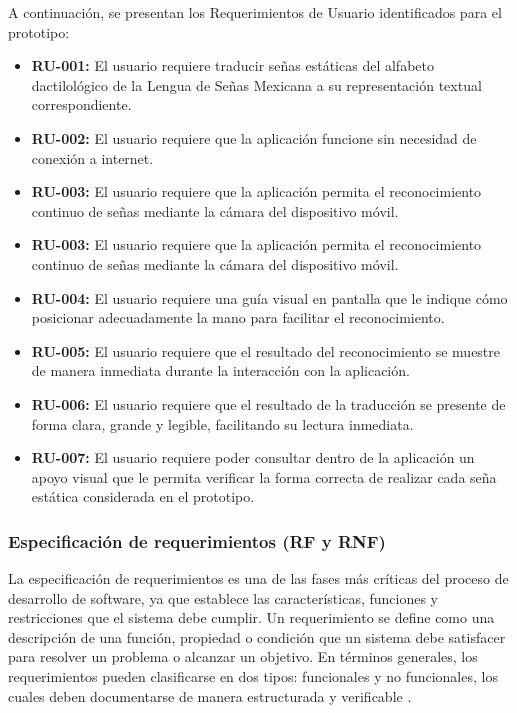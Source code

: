 	A continuación, se presentan los Requerimientos de Usuario identificados para el prototipo:
	
	\begin{itemize}
		\item \textbf{RU-001:} El usuario requiere traducir señas estáticas del alfabeto dactilológico de la Lengua de Señas Mexicana a su representación textual correspondiente.
		
		\item \textbf{RU-002:} El usuario requiere que la aplicación funcione sin necesidad de conexión a internet.
		
		\item \textbf{RU-003:} El usuario requiere que la aplicación permita el reconocimiento continuo de señas mediante la cámara del dispositivo móvil.
		\item \textbf{RU-003:} El usuario requiere que la aplicación permita el reconocimiento continuo de señas mediante la cámara del dispositivo móvil.
		\item \textbf{RU-004:} El usuario requiere una guía visual en pantalla que le indique cómo posicionar adecuadamente la mano para facilitar el reconocimiento.
		
		\item \textbf{RU-005:} El usuario requiere que el resultado del reconocimiento se muestre de manera inmediata durante la interacción con la aplicación.
		
		\item \textbf{RU-006:} El usuario requiere que el resultado de la traducción se presente de forma clara, grande y legible, facilitando su lectura inmediata.
		
		\item \textbf{RU-007:} El usuario requiere poder consultar dentro de la aplicación un apoyo visual que le permita verificar la forma correcta de realizar cada seña estática considerada en el prototipo.
	\end{itemize}
	
	
	\subsubsection{Especificación de requerimientos (RF y RNF)}
	
	La especificación de requerimientos es una de las fases más críticas del proceso de desarrollo de software, ya que establece las características, funciones y restricciones que el sistema debe cumplir. Un requerimiento se define como una descripción de una función, propiedad o condición que un sistema debe satisfacer para resolver un problema o alcanzar un objetivo. En términos generales, los requerimientos pueden clasificarse en dos tipos: funcionales y no funcionales, los cuales deben documentarse de manera estructurada y verificable \cite{pressman2014,sommerville2016}.
	
